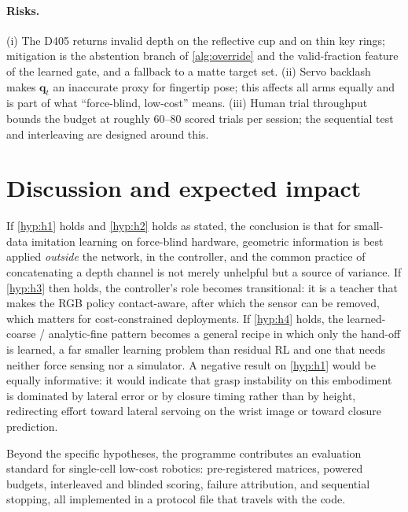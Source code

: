 \documentclass[11pt,a4paper]{article}
\theoremstyle{definition}
\newcommand{\state}{\bm{q}}
\begin{document}
\paragraph{Risks.}
(i) The D405 returns invalid depth on the reflective cup and on thin key rings; mitigation is the abstention branch of \cref{alg:override} and the valid-fraction feature of the learned gate, and a fallback to a matte target set. (ii) Servo backlash makes $\state_t$ an inaccurate proxy for fingertip pose; this affects all arms equally and is part of what ``force-blind, low-cost'' means. (iii) Human trial throughput bounds the budget at roughly 60--80 scored trials per session; the sequential test and interleaving are designed around this.

\section{Discussion and expected impact}

If \cref{hyp:h1} holds and \cref{hyp:h2} holds as stated, the conclusion is that for small-data imitation learning on force-blind hardware, geometric information is best applied \emph{outside} the network, in the controller, and the common practice of concatenating a depth channel is not merely unhelpful but a source of variance. If \cref{hyp:h3} then holds, the controller's role becomes transitional: it is a teacher that makes the RGB policy contact-aware, after which the sensor can be removed, which matters for cost-constrained deployments. If \cref{hyp:h4} holds, the learned-coarse / analytic-fine pattern becomes a general recipe in which only the hand-off is learned, a far smaller learning problem than residual RL and one that needs neither force sensing nor a simulator. A negative result on \cref{hyp:h1} would be equally informative: it would indicate that grasp instability on this embodiment is dominated by lateral error or by closure timing rather than by height, redirecting effort toward lateral servoing on the wrist image or toward closure prediction.

Beyond the specific hypotheses, the programme contributes an evaluation standard for single-cell low-cost robotics: pre-registered matrices, powered budgets, interleaved and blinded scoring, failure attribution, and sequential stopping, all implemented in a protocol file that travels with the code.

\end{document}
